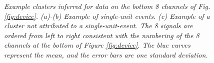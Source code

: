 \documentclass[journal]{IEEEtran}
\begin{document}
\begin{figure}[!htbp]
 \centering
{}
 
\caption{\label{fig:units}\small{\emph{Example
clusters inferred for data on the bottom 8 channels of Fig.
\ref{fig:device}. (a)-(b) Example of single-unit events. (c) Example
of a cluster \emph{not} attributed to a single-unit-event. The 8
signals are ordered from left to right consistent with the numbering
of the 8 channels at the bottom of Figure \ref{fig:device}. The blue curves represent the mean, and the error bars are one standard deviation.}}}
\end{figure}
\end{document}
